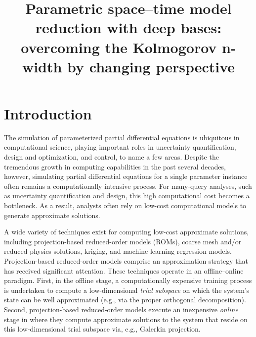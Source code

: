 \documentclass[3p,computermodern,10pt]{elsarticle}
\begin{document}
\begin{frontmatter}

\title{Parametric space--time model reduction with deep bases: overcoming the Kolmogorov n-width by changing perspective}

\begin{abstract}
\end{abstract}
\end{frontmatter}


\section{Introduction}
The simulation of parameterized partial differential equations is ubiquitous in computational science, playing important roles in uncertainty quantification, design and optimization, and control, to name a few areas. Despite the tremendous growth in computing capabilities in the past several decades, however, simulating partial differential equations for a single parameter instance often remains a computationally intensive process. For many-query analyses, such as uncertainty quantification and design, this high computational cost becomes a bottleneck. As a result, analysts often rely on low-cost computational models to generate approximate solutions. 

A wide variety of techniques exist for computing low-cost approximate solutions, including projection-based reduced-order models (ROMs), coarse mesh and/or reduced physics solutions, kriging, and machine learning regression models. Projection-based reduced-order models comprise an approximation strategy that has received significant attention. These techniques operate in an offline--online paradigm. First, in the offline stage, a computationally expensive training process is undertaken to compute a low-dimensional \textit{trial subspace} on which the system's state can be well approximated (e.g., via the proper orthogonal decomposition). Second, projection-based reduced-order models execute an inexpensive \textit{online} stage in where they compute approximate solutions to the system that reside on this low-dimensional trial subspace via, e.g., Galerkin projection. 
\end{document}
